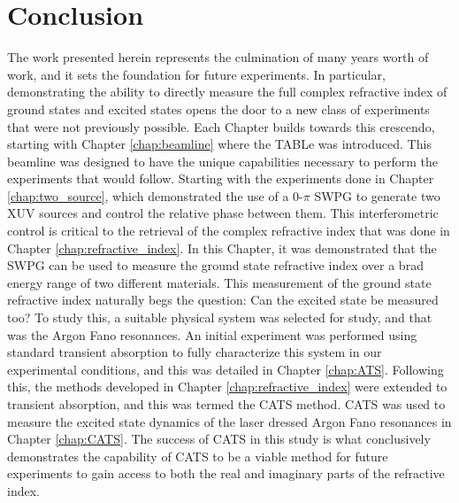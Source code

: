 \chapter{Conclusion}
\label{chap:conclusion}


The work presented herein represents the culmination of many years worth of work, and it sets the foundation for future experiments. In particular, demonstrating the ability to directly measure the full complex refractive index of ground states and excited states opens the door to a new class of experiments that were not previously possible.  Each Chapter builds towards this crescendo, starting with Chapter \ref{chap:beamline} where the TABLe was introduced.  This beamline was designed to have the unique capabilities necessary to perform the experiments that would follow.  Starting with the experiments done in Chapter \ref{chap:two_source}, which demonstrated the use of a 0-$\pi$ SWPG to generate two XUV sources and control the relative phase between them.  This interferometric control is critical to the retrieval of the complex refractive index that was done in Chapter \ref{chap:refractive_index}.  In this Chapter, it was demonstrated that the SWPG can be used to measure the ground state refractive index over a brad energy range of two different materials.  This measurement of the ground state refractive index naturally begs the question: Can the excited state be measured too?  To study this, a suitable physical system was selected for study, and that was the Argon Fano resonances.  An initial experiment was performed using standard transient absorption to fully characterize this system in our experimental conditions, and this was detailed in Chapter \ref{chap:ATS}.  Following this, the methods developed in Chapter \ref{chap:refractive_index} were extended to transient absorption, and this was termed the CATS method.  CATS was used to measure the excited state dynamics of the laser dressed Argon Fano resonances in Chapter \ref{chap:CATS}.  The success of CATS in this study is what conclusively demonstrates the capability of CATS to be a viable method for future experiments to gain access to both the real and imaginary parts of the refractive index.



